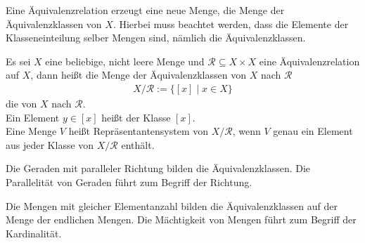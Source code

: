 \begin{Unit}
Eine Äquivalenzrelation erzeugt eine neue Menge, die Menge der 
Äquivalenzklassen von $X$. Hierbei muss beachtet werden, dass die Elemente 
der Klasseneinteilung selber Mengen sind, nämlich die Äquivalenzklassen.

\begin{Definition}
  Es sei $X$ eine beliebige, nicht leere Menge und $\mathcal{R} \subseteq X 
  \times X$ eine Äquivalenzrelation auf $X$, dann heißt die Menge der
  Äquivalenzklassen von $X$ nach $\mathcal{R}$
  \begin{align}
    X / \mathcal{R} := \{ [x] \mid x \in X \}
  \end{align}
  die  von $X$ nach $\mathcal{R}$.\\
  Ein Element $y \in [x]$ heißt  der Klasse $[x]$.\\
  Eine Menge $V$ heißt \index
  {Repräsentantensystem} von $X / \mathcal{R}$, wenn $V$ genau ein Element aus 
  jeder Klasse von $X / \mathcal{R}$ enthält.
\end{Definition}
\end{Unit}

\begin{Unit}[Beispiel] 
  Die Geraden mit paralleler Richtung bilden die Äquivalenzklassen. Die 
  Parallelität von Geraden führt zum Begriff der Richtung.
\end{Unit}

\begin{Unit}[Beispiel] 
  Die Mengen mit gleicher Elementanzahl bilden die Äquivalenzklassen auf der 
  Menge der endlichen Mengen. Die Mächtigkeit von Mengen führt zum Begriff 
  der Kardinalität.
\end{Unit}

